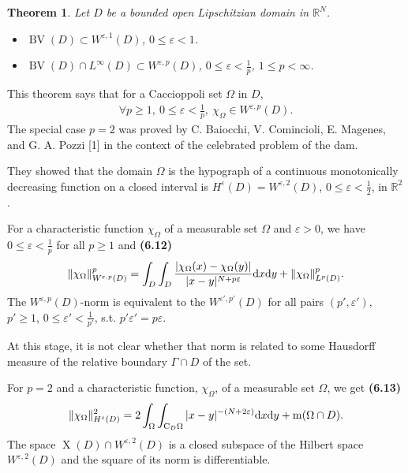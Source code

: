 \documentclass{book}
\numberwithin{equation}{section}
\newtheorem{theorem}{Theorem}[section]
\begin{document}
\begin{enumerate}
    \begin{theorem}
        Let $D$ be a bounded open Lipschitzian domain in $\mathbb{R}^N$.
        \begin{itemize}
            \item[(i)] $\operatorname{BV}(D)\subset W^{\varepsilon,1}(D)$, $0\le\varepsilon < 1$.
            \item[(ii)] $\operatorname{BV}(D)\cap L^\infty(D)\subset W^{\varepsilon,p}(D)$, $0\le\varepsilon < \frac{1}{p}$, $1\le p < \infty$.
        \end{itemize}
    \end{theorem}
    This theorem says that for a Caccioppoli set $\Omega$ in $D$,
    \begin{align*}
        \forall p\ge 1,\ 0\le\varepsilon < \frac{1}{p},\ \chi_\Omega\in W^{\varepsilon,p}(D).
    \end{align*}
    The special case $p = 2$ was proved by C. Baiocchi, V. Comincioli, E. Magenes, and G. A. Pozzi [1] in the context of the celebrated problem of the dam.
    
    They showed that the domain $\Omega$ is the hypograph of a continuous monotonically decreasing function on a closed interval is $H^\varepsilon(D) = W^{\varepsilon,2}(D)$, $0\le\varepsilon < \frac{1}{2}$, in $\mathbb{R}^2$.
    
    For a characteristic function $\chi_\Omega$ of a measurable set $\Omega$ and $\varepsilon > 0$, we have $0\le\varepsilon < \frac{1}{p}$ for all $p\ge 1$ and \textbf{(6.12)}
    \begin{align*}
        \|\chi_\Omega\|_{W^{\varepsilon,p}(D)}^p = \int_D\int_D \frac{|\chi_\Omega(x) - \chi_\Omega(y)|}{|x - y|^{N + p\varepsilon}}{\rm d}x{\rm d}y + \|\chi_\Omega\|_{L^p(D)}^p.
    \end{align*}
    The $W^{\varepsilon,p}(D)$-norm is equivalent to the $W^{\varepsilon',p'}(D)$ for all pairs $(p',\varepsilon')$, $p'\ge 1$, $0\le\varepsilon' < \frac{1}{p'}$, s.t. $p'\varepsilon' = p\varepsilon$.
    
    At this stage, it is not clear whether that norm is related to some Hausdorff measure of the relative boundary $\Gamma\cap D$ of the set.
    
    For $p = 2$ and a characteristic function, $\chi_\Omega$, of a measurable set $\Omega$, we get \textbf{(6.13)}
    \begin{align*}
        \|\chi_\Omega\|_{H^\varepsilon(D)}^2 = 2\int_\Omega\int_{{\rm C}_D\Omega} |x - y|^{-(N + 2\varepsilon)}{\rm d}x{\rm d}y + \operatorname{m}(\Omega\cap D).
    \end{align*}
    The space $\operatorname{X}(D)\cap W^{\varepsilon,2}(D)$ is a closed subspace of the Hilbert space $W^{\varepsilon,2}(D)$ and the square of its norm is differentiable.
    

\end{enumerate}
\end{document}
